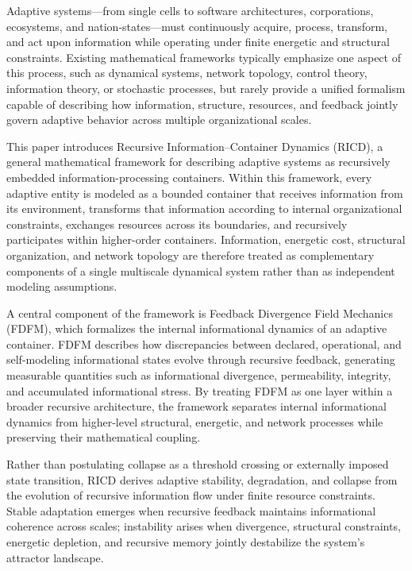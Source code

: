 \documentclass[
]{article}
\begin{document}
Adaptive systems---from single cells to software architectures,
corporations, ecosystems, and nation-states---must continuously acquire,
process, transform, and act upon information while operating under
finite energetic and structural constraints. Existing mathematical
frameworks typically emphasize one aspect of this process, such as
dynamical systems, network topology, control theory, information theory,
or stochastic processes, but rarely provide a unified formalism capable
of describing how information, structure, resources, and feedback
jointly govern adaptive behavior across multiple organizational scales.

This paper introduces Recursive Information--Container Dynamics (RICD),
a general mathematical framework for describing adaptive systems as
recursively embedded information-processing containers. Within this
framework, every adaptive entity is modeled as a bounded container that
receives information from its environment, transforms that information
according to internal organizational constraints, exchanges resources
across its boundaries, and recursively participates within higher-order
containers. Information, energetic cost, structural organization, and
network topology are therefore treated as complementary components of a
single multiscale dynamical system rather than as independent modeling
assumptions.

A central component of the framework is Feedback Divergence Field
Mechanics (FDFM), which formalizes the internal informational dynamics
of an adaptive container. FDFM describes how discrepancies between
declared, operational, and self-modeling informational states evolve
through recursive feedback, generating measurable quantities such as
informational divergence, permeability, integrity, and accumulated
informational stress. By treating FDFM as one layer within a broader
recursive architecture, the framework separates internal informational
dynamics from higher-level structural, energetic, and network processes
while preserving their mathematical coupling.

Rather than postulating collapse as a threshold crossing or externally
imposed state transition, RICD derives adaptive stability, degradation,
and collapse from the evolution of recursive information flow under
finite resource constraints. Stable adaptation emerges when recursive
feedback maintains informational coherence across scales; instability
arises when divergence, structural constraints, energetic depletion, and
recursive memory jointly destabilize the system's attractor landscape.
\end{document}
